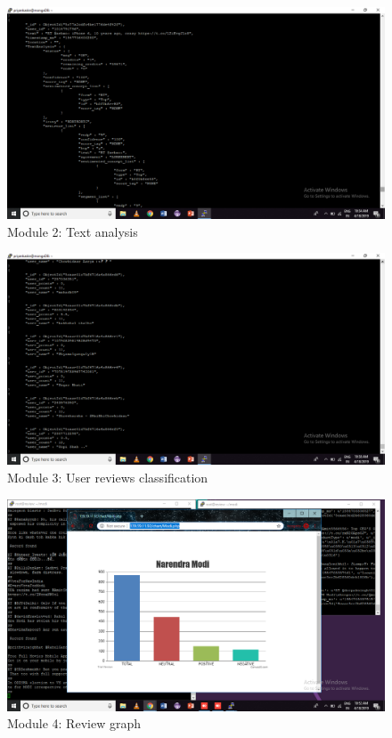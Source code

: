 \documentclass[oneside,a4paper,12pt]{book}
\begin{document}
\begin{figure}[h!]
  \centering
  \includegraphics[width=\linewidth]{mod2.png}
  \caption{Module 2: Text analysis}
\end{figure}

\begin{figure}[h!]
  \centering
  \includegraphics[width=\linewidth]{mod3.png}
  \caption{Module 3: User reviews classification}
\end{figure}

\begin{figure}[h!]
  \centering
  \includegraphics[width=\linewidth]{modres.png}
  \caption{Module 4: Review graph}
\end{figure}
\newpage
\end{document}
